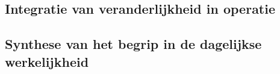 {%



\subsection*{Integratie van veranderlijkheid in operatie}



\subsection*{Synthese van het begrip in de dagelijkse werkelijkheid}

}
